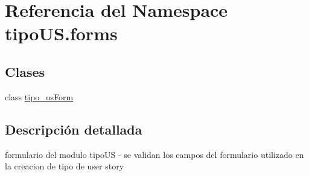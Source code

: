 \hypertarget{namespacetipo_u_s_1_1forms}{}\section{Referencia del Namespace tipo\+U\+S.\+forms}
\label{namespacetipo_u_s_1_1forms}
\subsection*{Clases}
\begin{DoxyCompactItemize}
\item 
class \hyperlink{classtipo_u_s_1_1forms_1_1tipo__us_form}{tipo\+\_\+us\+Form}
\end{DoxyCompactItemize}


\subsection{Descripción detallada}
\begin{DoxyVerb}formulario del modulo tipoUS
- se validan los campos del formulario utilizado en la creacion de tipo de user story
\end{DoxyVerb}
 